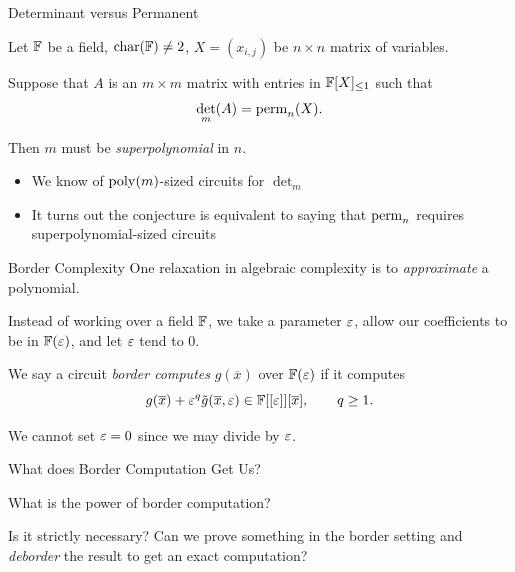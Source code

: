 \documentclass[aspectratio=169]{beamer}
\begin{document}
\begin{frame}{Determinant versus Permanent}
  \begin{conj}\label{conj:det_vs_perm}
    Let $\mathbb{F}$ be a field, $\mathrm{char}(\mathbb{F}) \neq 2$, $X = (x_{i, j})$ be $n \times n$ matrix of variables.

    \pause
    \vspace{10pt}

    Suppose that $A$ is an $m \times m$ matrix with entries in $\mathbb{F}[X]_{\leq 1}$ such that
    \[
      \det_m(A) = \operatorname{perm}_n(X).
    \]

    \pause
    \vspace{10pt}

    Then $m$ must be \emph{superpolynomial} in $n$.
  \end{conj}

  \pause

  \begin{itemize}
  \item We know of $\operatorname{poly}(m)$-sized circuits for $\det_m$
  \item It turns out the conjecture is equivalent to saying that $\operatorname{perm}_n$ requires superpolynomial-sized circuits
  \end{itemize}
\end{frame}

\begin{frame}{Border Complexity}
    One relaxation in algebraic complexity is to \emph{approximate} a polynomial.

    \pause
    \vspace{10pt}

    Instead of working over a field $\mathbb{F}$\pause, we take a parameter $\varepsilon$, allow our coefficients to be in $\mathbb{F}(\varepsilon)$, and let $\varepsilon$ tend to $0$.

    \pause
    \vspace{10pt}
    
    \begin{defn}
    We say a circuit \emph{border computes} $g(\overline{x})$ over $\mathbb{F}(\varepsilon)$ if it computes
    \[
        g(\overline{x}) + \varepsilon^q \tilde{g}(\overline{x}, \varepsilon) \in \mathbb{F}[[\varepsilon]][\overline{x}], \qquad q \geq 1.
    \]
    \end{defn}

    \pause

    We \textcolor{sigma@alertred}{cannot} set $\varepsilon = 0$ since we may divide by $\varepsilon$.
\end{frame}

\begin{frame}{What does Border Computation Get Us?}
    \begin{question}
        What is the power of border computation?

        \pause
        \vspace{20pt}

        Is it strictly necessary? \pause
        Can we prove something in the border setting and \emph{deborder} the result to get an exact computation?
    \end{question}    
\end{frame}
\end{document}

